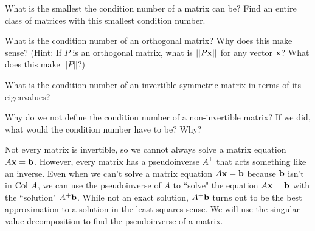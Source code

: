 \begin{activity} \hfill
	\ba
	\item What is the smallest the condition number of a matrix can be? Find an entire class of matrices with this smallest condition number.
	
	

	\item What is the condition number of an orthogonal matrix? Why does this make sense? (Hint: If $P$ is an orthogonal matrix, what is $||P \mathbf{x}||$ for any vector $\mathbf{x}$? What does this make $||P||$?)
	
	
	
	\item What is the condition number of an invertible symmetric matrix in terms of its eigenvalues?
	
	
	
	\item Why do we not define the condition number of a non-invertible matrix? If we did, what would the condition number have to be? Why?
	
	
	
	\ea
\end{activity}


\label{sec:pseudoinverses}

Not every matrix is invertible, so we cannot always solve a matrix equation $A \mathbf{x} = \mathbf{b}$. However, every matrix has a pseudoinverse $A^+$ that acts something like an inverse. Even when we can't solve a matrix equation $A \mathbf{x} = \mathbf{b}$ because $\mathbf{b}$ isn't in $\text{Col } A$, we can use the pseudoinverse of $A$ to ``solve" the equation $A \mathbf{x} = \mathbf{b}$ with the ``solution" $A^+ \mathbf{b}$. While not an exact solution, $A^+ \mathbf{b}$ turns out to be the best approximation to a solution in the least squares sense. We will use the singular value decomposition to find the pseudoinverse of a matrix.


